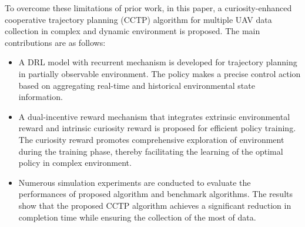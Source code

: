 \documentclass[conference]{IEEEtran}
\begin{document}
To overcome these limitations of prior work, in this paper, a curiosity-enhanced cooperative trajectory planning (CCTP) algorithm for multiple UAV data collection in complex and dynamic environment is proposed. The main contributions are as follows: 
\begin{itemize}
\item A DRL model with recurrent mechanism is developed for trajectory planning in partially observable environment. The policy makes a precise control action based on aggregating real-time and historical environmental state information. 
\item A dual-incentive reward mechanism that integrates extrinsic environmental reward and intrinsic curiosity reward is proposed for efficient policy training. The curiosity reward promotes comprehensive exploration of environment during the training phase, thereby facilitating the learning of the optimal policy in complex environment. 
\item Numerous simulation experiments are conducted to evaluate the performances of proposed algorithm and benchmark algorithms. The results show that the proposed CCTP algorithm achieves a significant reduction in completion time while ensuring the collection of the most of data. 
\end{itemize}
\end{document}
